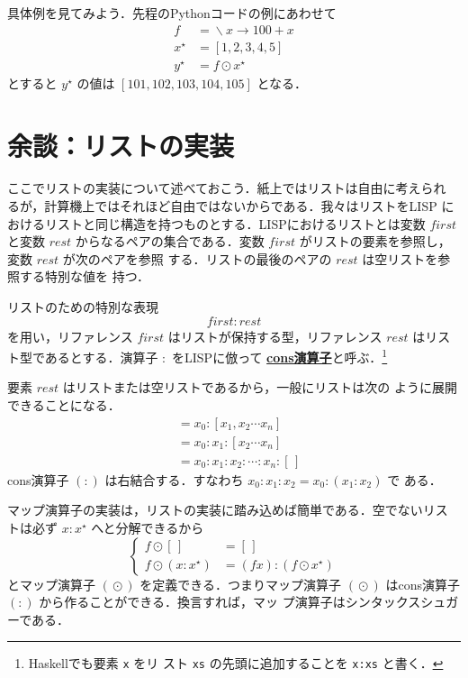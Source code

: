 \documentclass[a5paper,twoside,fleqn,draft]{jsbook}
\newcommand{\TK}[1]{\mask{\textbf{TK:}~#1}{C}}
\newcommand{\programminglanguage}[1]{\textsf{#1}}
\newcommand{\haskell}{\programminglanguage{Haskell}}
\newcommand{\lisp}{\programminglanguage{LISP}}
\newcommand{\python}{\programminglanguage{Python}}
\newcommand{\keyword}[1]{{\underline{\textbf{#1}}}}
\newcommand{\code}[1]{\texttt{#1}}
\newcommand{\mEmptyList}{{[\,]}}
\newcommand{\mSpecialVar}[1]{\mathit{#1}}
\newcommand{\mFirstVar}{\mSpecialVar{first}}
\newcommand{\mRestVar}{\mSpecialVar{rest}}
\DeclareMathOperator{\mLambda}{\backslash}
\DeclareMathOperator{\mLambdaArrow}{\rightarrow}
\DeclareMathOperator{\mMapList}{\odot}
\newcommand{\mList}[1]{{#1}^\mathrm{\star}}
\begin{document}
\TK{liftM}

具体例を見てみよう．先程の\python コードの例にあわせて
\begin{align}
  f
  &=\mLambda x\mLambdaArrow100+x\\
  \mList{x}
  &=[1,2,3,4,5]\\
  \mList{y}
  &=f\mMapList\mList{x}
\end{align}
とすると $\mList{y}$ の値は $[101,102,103,104,105]$ となる．

\section{余談：リストの実装}

ここでリストの実装について述べておこう．紙上ではリストは自由に考えられ
るが，計算機上ではそれほど自由ではないからである．我々はリストを\lisp
におけるリストと同じ構造を持つものとする．\lisp におけるリストとは変数
$\mFirstVar$ と変数 $\mRestVar$ からなるペアの集合である．変数
$\mFirstVar$ がリストの要素を参照し，変数 $\mRestVar$ が次のペアを参照
する．リストの最後のペアの $\mRestVar$ は空リストを参照する特別な値を
持つ．

リストのための特別な表現
\begin{equation}
  \mFirstVar:\mRestVar
\end{equation}
を用い，リファレンス $\mFirstVar$ はリストが保持する型，リファレンス
$\mRestVar$ はリスト型であるとする．演算子 $:$ を\lisp に倣って
\keyword{cons演算子}と呼ぶ．\footnote{\haskell でも要素 \code{x} をリ
  スト \code{xs} の先頭に追加することを \code{x:xs} と書く．}

要素 $\mRestVar$ はリストまたは空リストであるから，一般にリストは次の
ように展開できることになる．
\begin{align}
  [x_0,x_1,x_2\dotsb x_n]
  &=x_0:[x_1,x_2\dotsb x_n]\\
  &=x_0:x_1:[x_2\dotsb x_n]\\
  &=x_0:x_1:x_2:\dotsb:x_n:\mEmptyList
\end{align}
cons演算子 $(:)$ は右結合する．すなわち $x_0:x_1:x_2=x_0:(x_1:x_2)$ で
ある．

マップ演算子の実装は，リストの実装に踏み込めば簡単である．空でないリス
トは必ず $x:\mList{x}$ へと分解できるから
\begin{equation}
  \left\{
  \begin{aligned}
    f\mMapList\mEmptyList
    &=\mEmptyList\\
    f\mMapList{}(x:\mList{x})
    &=(fx):(f\mMapList\mList{x})
  \end{aligned}
  \right.
\end{equation}
とマップ演算子 $(\mMapList)$ を定義できる．つまりマップ演算子
$(\mMapList)$ はcons演算子 $(:)$ から作ることができる．換言すれば，マッ
プ演算子はシンタックスシュガーである．
\end{document}
